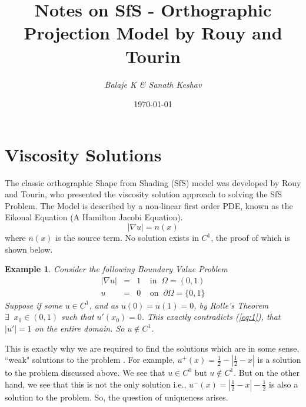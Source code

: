 \documentclass[11pt]{article}
\newtheorem{example}{Example}
\begin{document}
	\title{\textbf{Notes on SfS - Orthographic Projection Model by Rouy and Tourin }}
	\author{\textit{Balaje K \& Sanath Keshav}}
	\date{\today}
	\maketitle
	
	\section{Viscosity Solutions}
	The classic orthographic Shape from Shading (SfS) model was developed by Rouy and Tourin, who presented the viscosity solution approach to solving the SfS Problem. The Model is described by a non-linear first order PDE, known as the Eikonal Equation (A Hamilton Jacobi Equation).
	\begin{equation}
		|\nabla u| = n(x)
	\end{equation}
	where $n(x)$ is the source term. No solution exists in $C^1$, the proof of which is shown below.\\
	
	\noindent
	\begin{example}
		Consider the following Boundary Value Problem
		\begin{eqnarray}\label{eq:1}
		|\nabla u| &=& 1 \;\;\;\; \text{in} \;\; \Omega = (0,1) \\
		u &=& 0 \;\;\;\; \text{on} \;\; \partial \Omega = \{0,1\}\label{eq:2}
		\end{eqnarray}
		Suppose if some $u \in C^1$, and as $u(0)=u(1)=0$, by Rolle's Theorem $\exists\;\; x_0 \in (0,1)$ such that $u'(x_0) = 0$. This exactly contradicts (\ref{eq:1}), that $|u'| = 1$ on the entire domain. So $u \notin C^1$. \\
	\end{example}
	
	\noindent
	This is exactly why we are required to find the solutions which are in some sense, ``weak" solutions to the problem \cite{yong}. For example, $u^+(x) = \frac{1}{2}- \left|\frac{1}{2} - x\right|$ is a solution to the problem discussed above. We see that $u \in C^0$ but $u \notin C^1$. But on the other hand, we see that this is not the only solution i.e., $u^-(x) = \left | \frac{1}{2} - x\right | - \frac{1}{2}$ is also a solution to the problem. So, the question of uniqueness arises.\\
	
\end{document}
